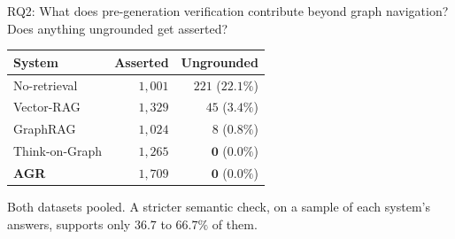 {\rqtitlesize{11.6pt}{14.5pt}%

\begin{frame}{RQ2: What does pre-generation verification contribute beyond graph navigation?}{Does anything ungrounded get asserted?}
  \bodyshift{-2.75pt}
  \begin{table}
    \small
    \renewcommand{\arraystretch}{1.1}
    \begin{tabular}{@{}lrr@{}}
      \toprule
      \textbf{System} & \textbf{Asserted} & \textbf{Ungrounded} \\
      \midrule
      No-retrieval    & $1{,}001$ & $221$ ($22.1\%$) \\
      Vector-RAG      & $1{,}329$ & $45$ ($3.4\%$) \\
      GraphRAG        & $1{,}024$ & $8$ ($0.8\%$) \\
      Think-on-Graph  & $1{,}265$ & $\mathbf{0}$ ($\mathbf{0.0\%}$) \\
      \textbf{AGR}    & $1{,}709$ & $\mathbf{0}$ ($\mathbf{0.0\%}$) \\
      \bottomrule
    \end{tabular}
  \end{table}
  {\small\agrraggedright Both datasets pooled. A stricter semantic check,
  on a sample of each system's answers, supports only $36.7$ to
  $66.7\%$ of them.\par}
\end{frame}

}
